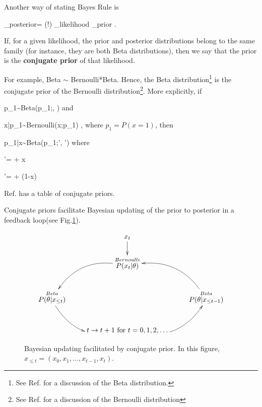 Another way of stating
Bayes Rule is




\beq
{}_{\rm posterior}=
\caln(!\theta)
_{\rm likelihood}
_{\rm prior}
\;.
\eeq

If, for a given likelihood,
the prior and posterior
distributions belong to
the same family (for instance,
they are both
Beta distributions),
then we say that the prior is the
{\bf conjugate prior}
of that likelihood.

For example,
Beta $\sim$ Bernoulli*Beta.
Hence, the
Beta distribution\footnote{See
Ref.\cite{wiki-beta-dist} for a discussion
of the Beta distribution.}
is the conjugate prior of the
Bernoulli distribution\footnote{See
Ref.\cite{wiki-bern-dist} for a discussion
of the Bernoulli distribution}.
More explicitly,
if

\beq
p_1\sim {\rm Beta}(p_1;\alp, \beta)
\eeq
and

\beq
x|p_1\sim {\rm Bernoulli}(x;p_1)
\;,
\eeq
where $p_1=P(x=1)$,
then

\beq
p_1|x\sim {\rm Beta}(p_1;\alp', \beta')
\eeq
where

\beq
\alp'= \alp + x
\eeq

\beq
\beta'= \beta + (1-x)
\eeq


Ref.\cite{wiki-conj-prior}
has a table of
conjugate priors.

Conjugate priors facilitate
Bayesian updating
of the prior to
posterior in a
feedback loop(see Fig.\ref{fig-conj-prior}).

\begin{figure}[h!]
$$\xymatrix{
&x_t\ar[d]
\\
&\stackrel{Bernoulli}{P(x_t|\theta)}\ar@/_2pc/[ld]
\\
\stackrel{Beta}{P(\theta|x_{\leq t})}\ar@/_2pc/[rd]
&&\stackrel{Beta}{P(\theta|x_{\leq t-1})}\ar@/_2pc/[ul]
\\
&t\rarrow t+1 \text{ for } t=0, 1, 2,\ldots
\ar@/_2pc/[ur]
}$$
\caption{Bayesian updating facilitated
by conjugate prior. In this figure,
$x_{\leq t}=(x_0, x_1, \ldots, x_{t-1}, x_t)$.}
\label{fig-conj-prior}
\end{figure}


